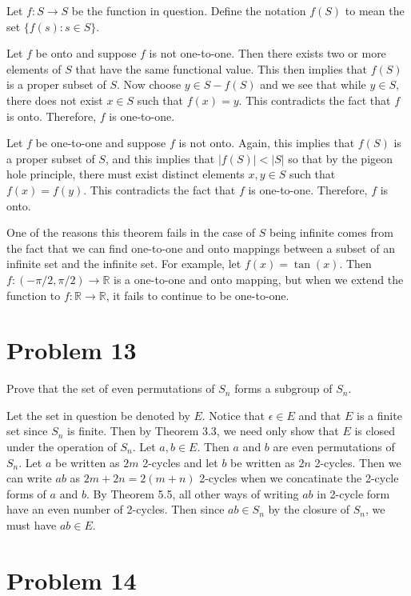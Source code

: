 \documentclass{article}
\begin{document}
Let $f:S\to S$ be the function in question.
Define the notation $f(S)$ to mean the set $\{f(s):s\in S\}$.

Let $f$ be onto and suppose $f$ is not one-to-one.  Then there exists two or
more elements of $S$ that have the same functional value.  This then implies
that $f(S)$ is a proper subset of $S$.  Now choose
$y\in S-f(S)$ and we see that while $y\in S$,
there does not exist $x\in S$ such that $f(x)=y$.  This contradicts the
fact that $f$ is onto.  Therefore, $f$ is one-to-one.

Let $f$ be one-to-one and suppose $f$ is not onto.  Again, this implies that
$f(S)$ is a proper subset of $S$, and this implies that $|f(S)|<|S|$ so that
by the pigeon hole principle, there must exist distinct elements $x,y\in S$ such
that $f(x)=f(y)$.  This contradicts the fact that $f$ is one-to-one.  Therefore,
$f$ is onto.

One of the reasons this theorem fails in the case of $S$ being infinite comes
from the fact that we can find one-to-one and onto mappings between a subset of
an infinite set and the infinite set.  For example, let $f(x)=\tan(x)$.  Then
$f:(-\pi/2,\pi/2)\to\mathbb{R}$ is a one-to-one and onto mapping, but when we
extend the function to $f:\mathbb{R}\to\mathbb{R}$, it fails to continue to be one-to-one.

\section*{Problem 13}

Prove that the set of even permutations of $S_n$ forms a subgroup of $S_n$.

Let the set in question be denoted by $E$.  Notice that $\epsilon\in E$ and
that $E$ is a finite set since $S_n$ is finite.
Then by Theorem 3.3, we need only show that $E$ is closed under the operation
of $S_n$.  Let $a,b\in E$.  Then $a$ and $b$ are even permutations of $S_n$.
Let $a$ be written as $2m$ 2-cycles and let $b$ be written as $2n$ 2-cycles.
Then we can write $ab$ as $2m+2n=2(m+n)$ 2-cycles when we concatinate the
2-cycle forms of $a$ and $b$.  By Theorem 5.5, all
other ways of writing $ab$ in 2-cycle form have an even number of 2-cycles.
Then since $ab\in S_n$ by the closure of $S_n$, we must have $ab\in E$.

\section*{Problem 14}
\end{document}
